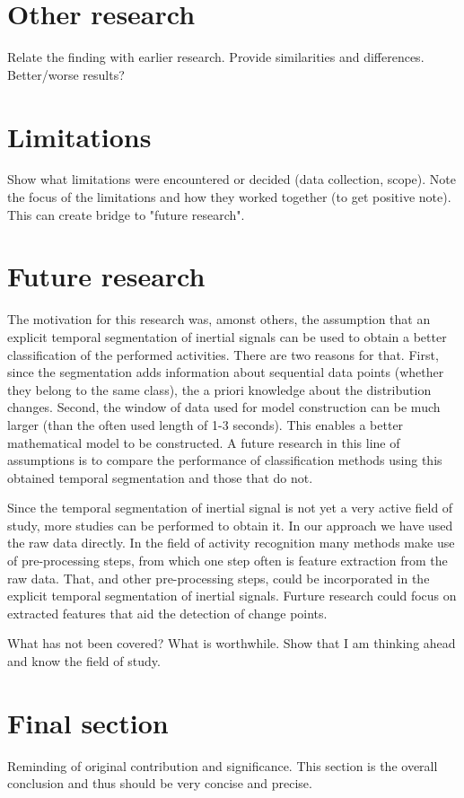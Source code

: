 \section{Other research}
Relate the finding with earlier research.
Provide similarities and differences.
Better/worse results?

\section{Limitations}
Show what limitations were encountered or decided (data collection, scope).
Note the focus of the limitations and how they worked together (to get positive note).
This can create bridge to "future research".

\section{Future research}
The motivation for this research was, amonst others, the assumption that an explicit temporal segmentation of inertial signals can be used to obtain a better classification of the performed activities.
There are two reasons for that.
First, since the segmentation adds information about sequential data points (whether they belong to the same class), the a priori knowledge about the distribution changes.
Second, the window of data used for model construction can be much larger (than the often used length of 1-3 seconds).
This enables a better mathematical model to be constructed.
A future research in this line of assumptions is to compare the performance of classification methods using this obtained temporal segmentation and those that do not.

Since the temporal segmentation of inertial signal is not yet a very active field of study, more studies can be performed to obtain it.
In our approach we have used the raw data directly.
In the field of activity recognition many methods make use of pre-processing steps, from which one step often is feature extraction from the raw data.
That, and other pre-processing steps, could be incorporated in the explicit temporal segmentation of inertial signals.
Furture research could focus on extracted features that aid the detection of change points.



What has not been covered? What is worthwhile.
Show that I am thinking ahead and know the field of study.



\section{Final section}
Reminding of original contribution and significance.
This section is the overall conclusion and thus should be very concise and precise.

